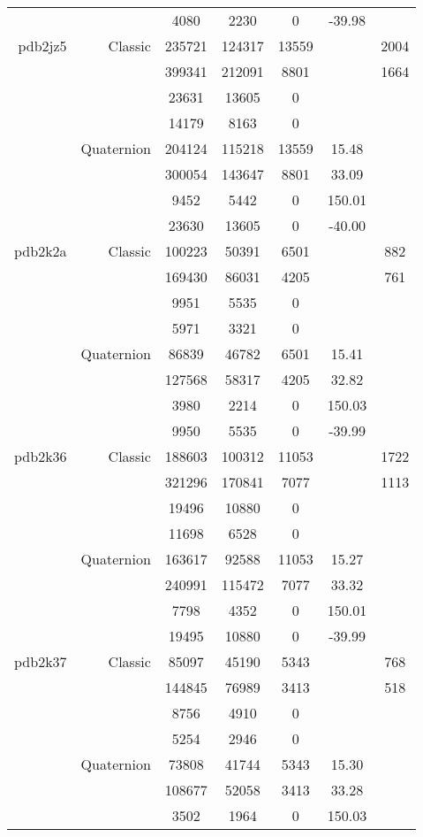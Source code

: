 \begin{xltabular}{\textwidth}{r|rcccSc}
& & 4080 & 2230 & 0 & -39.98 & \\ \addlinespace
pdb2jz5 & Classic & 235721 & 124317 & 13559 & & 2004 \\
& & 399341 & 212091 & 8801 & & 1664 \\
& & 23631 & 13605 & 0 & & \\
& & 14179 & 8163 & 0 & & \\
& Quaternion & 204124 & 115218 & 13559 & 15.48 & \\
& & 300054 & 143647 & 8801 & 33.09 & \\
& & 9452 & 5442 & 0 & 150.01 & \\
& & 23630 & 13605 & 0 & -40.00 & \\ \addlinespace
pdb2k2a & Classic & 100223 & 50391 & 6501 & & 882 \\
& & 169430 & 86031 & 4205 & & 761 \\
& & 9951 & 5535 & 0 & & \\
& & 5971 & 3321 & 0 & & \\
& Quaternion & 86839 & 46782 & 6501 & 15.41 & \\
& & 127568 & 58317 & 4205 & 32.82 & \\
& & 3980 & 2214 & 0 & 150.03 & \\
& & 9950 & 5535 & 0 & -39.99 & \\ \addlinespace
pdb2k36 & Classic & 188603 & 100312 & 11053 & & 1722 \\
& & 321296 & 170841 & 7077 & & 1113 \\
& & 19496 & 10880 & 0 & & \\
& & 11698 & 6528 & 0 & & \\
& Quaternion & 163617 & 92588 & 11053 & 15.27 & \\
& & 240991 & 115472 & 7077 & 33.32 & \\
& & 7798 & 4352 & 0 & 150.01 & \\
& & 19495 & 10880 & 0 & -39.99 & \\ \addlinespace
pdb2k37 & Classic & 85097 & 45190 & 5343 & & 768 \\
& & 144845 & 76989 & 3413 & & 518 \\
& & 8756 & 4910 & 0 & & \\
& & 5254 & 2946 & 0 & & \\
& Quaternion & 73808 & 41744 & 5343 & 15.30 & \\
& & 108677 & 52058 & 3413 & 33.28 & \\
& & 3502 & 1964 & 0 & 150.03 & \\

\end{xltabular}
